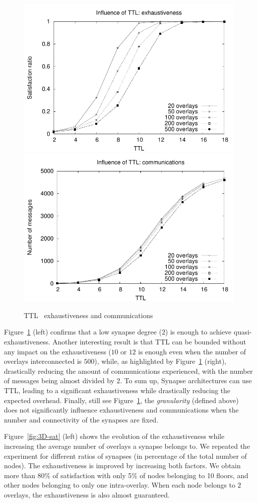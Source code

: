 \begin{figure}[!t]
  \includegraphics[width=0.5\linewidth]{fig/TTL-sat.pdf}
  \includegraphics[width=0.5\linewidth]{fig/TTL-msgs.pdf}
  \caption{TTL \vs\ exhaustiveness and communications\label{fig:TTL-sat}}
\end{figure}
% 
%  
Figure~\ref{fig:TTL-sat} (left) confirms that a low synapse degree
($2$) is enough to achieve quasi-exhaustiveness. Another interesting
result is that TTL can be bounded without any impact on the
exhaustiveness ($10$ or $12$ is enough even when the number of
overlays interconnected is $500$), while, as highlighted by
Figure~\ref{fig:TTL-sat} (right), drastically reducing the amount of
communications experienced, with the number of messages being almost
divided by $2$. To sum up, Synapse architectures can use TTL, leading
to a significant exhaustiveness while drastically reducing the
expected overhead.
%
Finally, still see Figure~\ref{fig:TTL-sat}, the \emph{granularity}
(defined above) does not significantly influence exhaustiveness and
communications when the number and connectivity of the synapses are
fixed.

%
%
Figure~\ref{fig:3D-sat} (left) shows the evolution of the
exhaustiveness while increasing the average number of overlays a
synapse belongs to. We repeated the experiment for different ratios of
synapses (in percentage of the total number of nodes). The
exhaustiveness is improved by increasing both factors. We obtain more
than 80\% of satisfaction with only 5\% of nodes belonging to 10
floors, and other nodes belonging to only one intra-overlay. When each
node belongs to $2$ overlays, the exhaustiveness is also almost
guaranteed.

